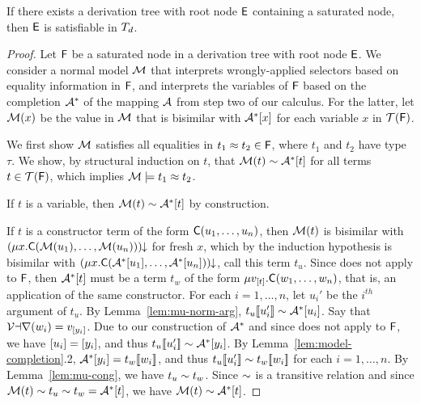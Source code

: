 \begin{lemma}%
\label{lem:ss}%
\afterDot
If there exists a derivation tree with root node $\mathsf{E}$ containing a saturated node, then $\mathsf{E}$ is satisfiable in $T_{d}$.
\end{lemma}
\begin{proof}
Let $\mathsf{F}$ be a saturated node in a derivation tree with root node $\mathsf{E}$.
We consider a normal model $\mathcal{M}$ 
that interprets wrongly-applied selectors based on equality information in $\mathsf{F}$,
and interprets the variables of $\mathsf{F}$ based on the completion $\mathcal{A}^\ast$ of the mapping $\mathcal{A}$ from step two of our calculus.
For the latter, let $\mathcal{M}( x )$ be the value in $\mathcal{M}$ that is bisimilar with $\mathcal{A}^\ast [ x ]$ for each variable $x$ in $\mathcal{T}(\mathsf{F})$.

We first show $\mathcal{M}$ satisfies all equalities in $t_1 \approx t_2 \in \mathsf{F}$, where $t_1$ and $t_2$ have type $\tau$.
We show,
by structural induction on $t$,
that $\mathcal{M}( t ) \sim \mathcal{A}^\ast [ t ]$ for all terms $t \in \mathcal{T}( \mathsf{F} )$,
which implies $\mathcal{M} \models t_1 \approx t_2$.

If $t$ is a variable, then $\mathcal{M}( t ) \sim \mathcal{A}^\ast [  t  ]$ by construction.

If $t$ is a constructor term of the form $\textsf{C}( u_1, \ldots, u_n )$, 
then $\mathcal{M}( t )$ is bisimilar with ${(\mu x. \textsf{C}( \mathcal{M}( u_1 ), \ldots, \mathcal{M}( u_n ) ) )}\!\!\downarrow$ for fresh $x$,
which by the induction hypothesis is bisimilar with ${(\mu x. \textsf{C}( \mathcal{A}^\ast [  u_1  ], \ldots, \mathcal{A}^\ast [  u_n  ] ) )}\!\!\downarrow$, call this term $t_u$.
Since  does not apply to $\mathsf{F}$,
then $\mathcal{A}^\ast [ t ]$ must be a term $t_w$ of the form $\mu v_{[ t ]}. \textsf{C}( w_1, \ldots, w_n )$,
that is, an application of the same constructor.
For each $i = 1, \ldots, n$, let $u_i'$ be the $i^{th}$ argument of $t_u$.
By Lemma~\ref{lem:mu-norm-arg}, $t_u[\![ u_i' ]\!] \sim \mathcal{A}^\ast [ u_i ]$.
Say that $\mathcal{Var}( w_i ) = v_{[ y_i ]}$.
Due to our construction of $\mathcal{A}^\ast$ and since  does not apply to $\mathsf{F}$, we have $[ u_i ] = [ y_i ]$,
and thus $t_u[\![ u_i' ]\!] \sim \mathcal{A}^\ast [ y_i ]$.
By Lemma~\ref{lem:model-completion}.2, $\mathcal{A}^\ast [  y_i  ] = t_w[\![  w_i  ]\!]$,
and thus $t_u[\![ u_i' ]\!] \sim t_w[\![  w_i  ]\!]$ for each $i = 1, \ldots, n$.
By Lemma~\ref{lem:mu-cong}, we have $t_u \sim t_w$.
Since $\sim$ is a transitive relation and since $\mathcal{M}( t ) \sim t_u \sim t_w = \mathcal{A}^\ast [ t ]$,
we have $\mathcal{M}( t ) \sim \mathcal{A}^\ast [ t ]$.


\end{proof}

